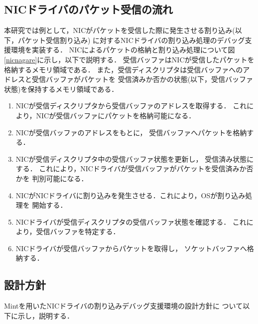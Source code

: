 \documentclass[submit,techreq,noauthor,dvipdfmx]{ipsj}
\begin{document}
\subsection{NICドライバのパケット受信の流れ}\label{sec:flow_of_recieving_packet_in_NIC_driver}


本研究では例として，NICがパケットを受信した際に発生させる割り込み(以下，パケット受信割り込み)
に対するNICドライバの割り込み処理のデバッグ支援環境を実装する．
NICによるパケットの格納と割り込み処理について図\ref{nicnagare}に示し，以下で説明する．
受信バッファはNICが受信したパケットを格納するメモリ領域である．
また，受信ディスクリプタは受信バッファへのアドレスと受信バッファがパケットを
受信済みか否かの状態(以下，受信バッファ状態)を保持するメモリ領域である．
\begin{enumerate}
    \item 
        NICが受信ディスクリプタから受信バッファのアドレスを取得する．
        これにより，NICが受信バッファにパケットを格納可能になる．
    \item 
        NICが受信バッファのアドレスをもとに，
        受信バッファへパケットを格納する．
    \item 
        NICが受信ディスクリプタ中の受信バッファ状態を更新し，
        受信済み状態にする．
        これにより，NICドライバが受信バッファがパケットを受信済みか否かを
        判別可能になる．
    \item 
        NICがNICドライバに割り込みを発生させる．これにより，OSが割り込み処理を
        開始する．
    \item 
        NICドライバが受信ディスクリプタの受信バッファ状態を確認する．
        これにより，受信バッファを特定する．
    \item 
        NICドライバが受信バッファからパケットを取得し，
        ソケットバッファへ格納する．
\end{enumerate}

\subsection{設計方針}\label{sec:policy_of_design}

Mintを用いたNICドライバの割り込みデバッグ支援環境の設計方針に
ついて以下に示し，説明する．
\end{document}
